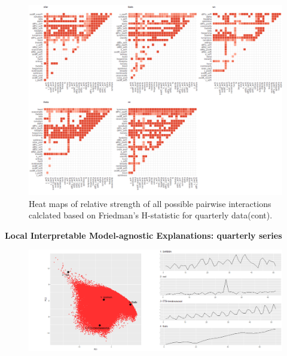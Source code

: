 \documentclass[11pt,a4paper,]{article}
\theoremstyle{definition}
\theoremstyle{definition}
\theoremstyle{definition}
\theoremstyle{remark}
\begin{document}
\begin{figure}
\centering
\includegraphics{figures/friedmanQ2-1.png}
\caption{\label{fig:friedmanQ2}Heat maps of relative strength of all
possible pairwise interactions calclated based on Friedman's H-statistic
for quarterly data(cont).}
\end{figure}

\newpage

\textbf{Local Interpretable Model-agnostic Explanations: quarterly
series}

\begin{figure}[h]

{\centering \includegraphics{figures/quarterlylime-1} 

}

\end{figure}
\end{document}
